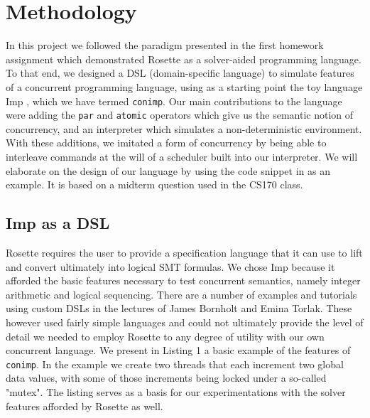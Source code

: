 \section{Methodology}
In this project we followed the paradigm presented in the first homework assignment which demonstrated Rosette as a solver-aided programming language.  To that end, we designed a DSL (domain-specific language) to simulate features of a concurrent programming language, using as a starting point the toy language Imp \citep{winskel1993}, which we have termed \texttt{conimp}. Our main contributions to the language were adding the \texttt{par} and \texttt{atomic} operators which give us the semantic notion of concurrency, and an interpreter which simulates a non-deterministic environment.  With these additions, we imitated a form of concurrency by being able to interleave commands at the will of a scheduler built into our interpreter.  We will elaborate on the design of our language by using the code snippet in as an example.  It is based on a midterm question used in the CS170 class.

\subsection{Imp as a DSL}
Rosette requires the user to provide a specification language that it can use to lift and convert ultimately into logical SMT formulas.  We chose Imp because it afforded the basic features necessary to test concurrent semantics, namely integer arithmetic and logical sequencing.  There are a number of examples and tutorials using custom DSLs  in the lectures of James Bornholt and Emina Torlak.  These however used fairly simple languages and could not ultimately provide the level of detail we needed to employ Rosette to any degree of utility with our own concurrent language.  We present in Listing 1 a basic example of the features of \texttt{conimp}.  In the example we create two threads that each increment two global data values, with some of those increments being locked under a so-called "mutex".  The listing serves as a basis for our experimentations with the solver features afforded by Rosette as well.

